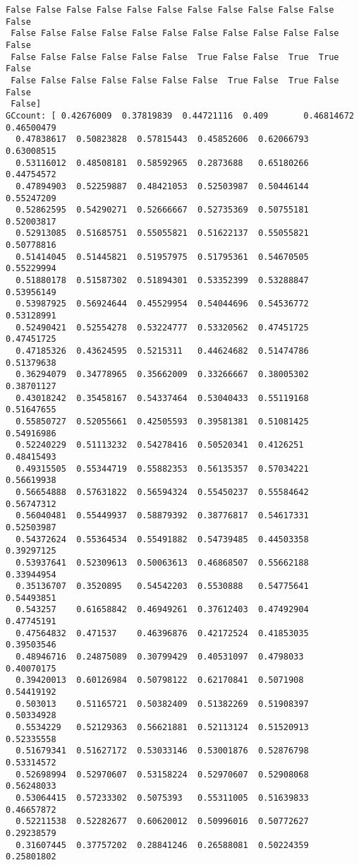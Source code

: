 \documentclass[11pt]{article}
\begin{document}
\begin{Verbatim}[commandchars=\\\{\}]
 False False False False False False False False False False False False
 False False False False False False False False False False False False
 False False False False False False  True False False  True  True False
 False False False False False False False  True False  True False False
 False]
GCcount: [ 0.42676009  0.37819839  0.44721116  0.409       0.46814672  0.46500479
  0.47838617  0.50823828  0.57815443  0.45852606  0.62066793  0.63008515
  0.53116012  0.48508181  0.58592965  0.2873688   0.65180266  0.44754572
  0.47894903  0.52259887  0.48421053  0.52503987  0.50446144  0.55247209
  0.52862595  0.54290271  0.52666667  0.52735369  0.50755181  0.52003817
  0.52913085  0.51685751  0.55055821  0.51622137  0.55055821  0.50778816
  0.51414045  0.51445821  0.51957975  0.51795361  0.54670505  0.55229994
  0.51880178  0.51587302  0.51894301  0.53352399  0.53288847  0.53956149
  0.53987925  0.56924644  0.45529954  0.54044696  0.54536772  0.53128991
  0.52490421  0.52554278  0.53224777  0.53320562  0.47451725  0.47451725
  0.47185326  0.43624595  0.5215311   0.44624682  0.51474786  0.51379638
  0.36294079  0.34778965  0.35662009  0.33266667  0.38005302  0.38701127
  0.43018242  0.35458167  0.54337464  0.53040433  0.55119168  0.51647655
  0.55850727  0.52055661  0.42505593  0.39581381  0.51081425  0.54916986
  0.52240229  0.51113232  0.54278416  0.50520341  0.4126251   0.48415493
  0.49315505  0.55344719  0.55882353  0.56135357  0.57034221  0.56619938
  0.56654888  0.57631822  0.56594324  0.55450237  0.55584642  0.56747312
  0.56040481  0.55449937  0.58879392  0.38776817  0.54617331  0.52503987
  0.54372624  0.55364534  0.55491882  0.54739485  0.44503358  0.39297125
  0.53937641  0.52309613  0.50063613  0.46868507  0.55662188  0.33944954
  0.35136707  0.3520895   0.54542203  0.5530888   0.54775641  0.54493851
  0.543257    0.61658842  0.46949261  0.37612403  0.47492904  0.47745191
  0.47564832  0.471537    0.46396876  0.42172524  0.41853035  0.39503546
  0.48946716  0.24875089  0.30799429  0.40531097  0.4798033   0.40070175
  0.39420013  0.60126984  0.50798122  0.62170841  0.5071908   0.54419192
  0.503013    0.51165721  0.50382409  0.51382269  0.51908397  0.50334928
  0.5534229   0.52129363  0.56621881  0.52113124  0.51520913  0.52335558
  0.51679341  0.51627172  0.53033146  0.53001876  0.52876798  0.53314572
  0.52698994  0.52970607  0.53158224  0.52970607  0.52908068  0.56248033
  0.53064415  0.57233302  0.5075393   0.55311005  0.51639833  0.46657872
  0.52211538  0.52282677  0.60620012  0.50996016  0.50772627  0.29238579
  0.31607445  0.37757202  0.28841246  0.26588081  0.50224359  0.25801802

\end{Verbatim}
\end{document}
